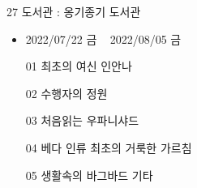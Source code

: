\documentclass[aspectratio=1610,17pt,xcolor=pdftex,dvipsnames,table,handout]{beamer}
\begin{document}
%
%
%
%								




		\begin{frame} [t,plain]

			\begin{block} { 27  도서관 : 옹기종기 도서관 }

			\begin{itemize}
			\item 	2022/07/22 금 ~ 2022/08/05 금
			\item 	[01]    최초의 여신 인안나
		      \item 	[02]    수행자의 정원
		      \item 	[03]   처음읽는 우파니샤드
		      \item 	[04]   베다 인류 최초의 거룩한 가르침
		      \item 	[05]   생활속의 바그바드 기타
			\end{itemize}



			\end{block}			
								
		\end{frame}	 %
\end{document}

